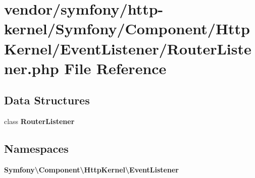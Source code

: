 \section{vendor/symfony/http-\/kernel/\+Symfony/\+Component/\+Http\+Kernel/\+Event\+Listener/\+Router\+Listener.php File Reference}
\label{_router_listener_8php}
\subsection*{Data Structures}
\begin{DoxyCompactItemize}
\item 
class {\bf Router\+Listener}
\end{DoxyCompactItemize}
\subsection*{Namespaces}
\begin{DoxyCompactItemize}
\item 
 {\bf Symfony\textbackslash{}\+Component\textbackslash{}\+Http\+Kernel\textbackslash{}\+Event\+Listener}
\end{DoxyCompactItemize}

